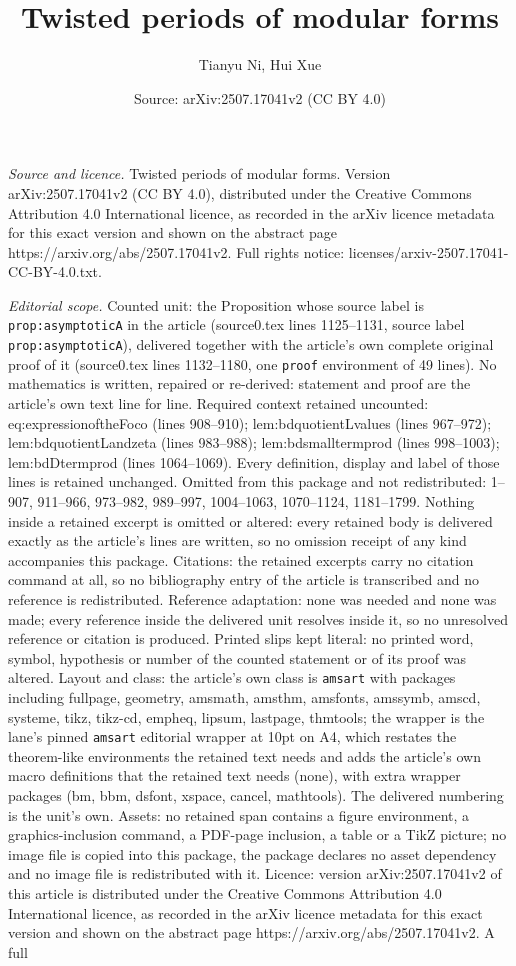 \documentclass[10pt,a4paper]{amsart}
\title[Twisted periods of modular forms]{Twisted periods of modular forms}
\author{Tianyu Ni, Hui Xue}
\date{Source: arXiv:2507.17041v2 (CC BY 4.0)}
\begin{document}
\maketitle

\noindent\emph{Source and licence.} Twisted periods of modular forms. Version arXiv:2507.17041v2 (CC BY 4.0), distributed under the Creative Commons Attribution 4.0 International licence, as recorded in the arXiv licence metadata for this exact version and shown on the abstract page https://arxiv.org/abs/2507.17041v2. Full rights notice: licenses/arxiv-2507.17041-CC-BY-4.0.txt.\par\smallskip

\noindent\textit{Editorial scope.} Counted unit: the Proposition whose source label is \texttt{prop:asymptoticA} in the article (source0.tex lines 1125--1131, source label \texttt{prop:asymptoticA}), delivered together with the article's own complete original proof of it (source0.tex lines 1132--1180, one \texttt{proof} environment of 49 lines). No mathematics is written, repaired or re-derived: statement and proof are the article's own text line for line. Required context retained uncounted: eq:expressionoftheFoco (lines 908--910); lem:bdquotientLvalues (lines 967--972); lem:bdquotientLandzeta (lines 983--988); lem:bdsmalltermprod (lines 998--1003); lem:bdDtermprod (lines 1064--1069). Every definition, display and label of those lines is retained unchanged. Omitted from this package and not redistributed: 1--907, 911--966, 973--982, 989--997, 1004--1063, 1070--1124, 1181--1799. Nothing inside a retained excerpt is omitted or altered: every retained body is delivered exactly as the article's lines are written, so no omission receipt of any kind accompanies this package. Citations: the retained excerpts carry no citation command at all, so no bibliography entry of the article is transcribed and no reference is redistributed. Reference adaptation: none was needed and none was made; every reference inside the delivered unit resolves inside it, so no unresolved reference or citation is produced. Printed slips kept literal: no printed word, symbol, hypothesis or number of the counted statement or of its proof was altered. Layout and class: the article's own class is \texttt{amsart} with packages including fullpage, geometry, amsmath, amsthm, amsfonts, amssymb, amscd, systeme, tikz, tikz-cd, empheq, lipsum, lastpage, thmtools; the wrapper is the lane's pinned \texttt{amsart} editorial wrapper at 10pt on A4, which restates the theorem-like environments the retained text needs and adds the article's own macro definitions that the retained text needs (none), with extra wrapper packages (bm, bbm, dsfont, xspace, cancel, mathtools). The delivered numbering is the unit's own. Assets: no retained span contains a figure environment, a graphics-inclusion command, a PDF-page inclusion, a table or a TikZ picture; no image file is copied into this package, the package declares no asset dependency and no image file is redistributed with it. Licence: version arXiv:2507.17041v2 of this article is distributed under the Creative Commons Attribution 4.0 International licence, as recorded in the arXiv licence metadata for this exact version and shown on the abstract page https://arxiv.org/abs/2507.17041v2. A full 
\end{document}

